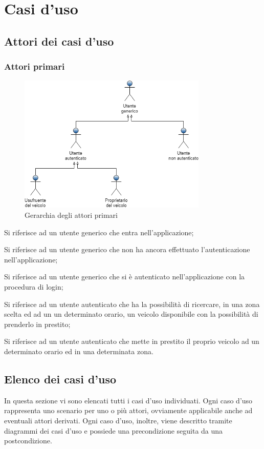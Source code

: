 \section{Casi d'uso} 
\subsection{Attori dei casi d'uso}
\subsubsection{Attori primari}
\begin{figure}[h]
	\includegraphics[width=9cm]{res/images/attori_primari.png}
	\centering
	\caption{Gerarchia degli attori primari}
\end{figure}
\begin{description}[style=nextline]
	\item[Utente generico]
	Si riferisce ad un utente generico che entra nell'applicazione;
	\item[Utente non autenticato]
	Si riferisce ad un utente generico che non ha ancora effettuato l'autenticazione nell'applicazione;
	\item[Utente autenticato]
	Si riferisce ad un utente generico che si è autenticato nell'applicazione con la procedura di login;
	\item[Usufruente del veicolo]
	Si riferisce ad un utente autenticato che ha la possibilità di ricercare, in una zona scelta ed ad un un determinato orario, un veicolo disponibile con la possibilità di prenderlo in prestito;
	\item[Proprietario del veicolo]
	Si riferisce ad un utente autenticato che mette in prestito il proprio veicolo ad un determinato orario ed in una determinata zona.	
\end{description}

\subsection{Elenco dei casi d'uso}
In questa sezione vi sono elencati tutti i casi d'uso individuati. Ogni caso d'uso rappresenta uno scenario per uno o più attori, ovviamente applicabile anche ad eventuali attori derivati. Ogni caso d'uso, inoltre, viene descritto tramite diagrammi dei casi d'uso e possiede una precondizione seguita da una postcondizione.
